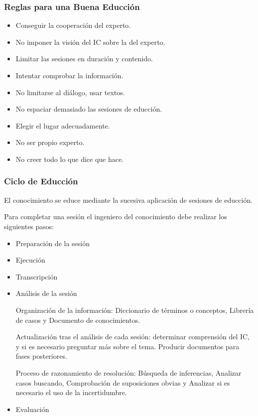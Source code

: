 \documentclass[12pt, twoside, openright]{report} %
\begin{document}
\subsubsection{Reglas para una Buena Educción}
\begin{itemize}
	\item Conseguir la cooperación del experto.
	\item No imponer la visión del IC sobre la del experto.
	\item Limitar las sesiones en duración y contenido.
	\item Intentar comprobar la información.
	\item No limitarse al diálogo, usar textos.
	\item No espaciar demasiado las sesiones de educción.
	\item Elegir el lugar adecuadamente.
	\item No ser propio experto.
	\item No creer todo lo que dice que hace.
\end{itemize}

\subsubsection{Ciclo de Educción}
El conocimiento se educe mediante la sucesiva aplicación de sesiones de educción.

Para completar una sesión el ingeniero del conocimiento debe realizar los siguientes pasos:
\begin{itemize}
	\item Preparación de la sesión
	\item Ejecución
	\item Transcripción
	\item Análisis de la sesión
	      
	      Organización de la información: Diccionario de términos o conceptos, Librería de casos y Documento de conocimientos.
	      
	      Actualización tras el análisis de cada sesión: determinar comprensión del IC, y si es necesario preguntar más sobre el tema. Producir documentos para fases posteriores.
	      
	      Proceso de razonamiento de resolución: Búsqueda de inferencias, Analizar casos buscando, Comprobación de suposiciones obvias y Analizar si es necesario el uso de la incertidumbre.
	\item Evaluación
\end{itemize}
\end{document}
